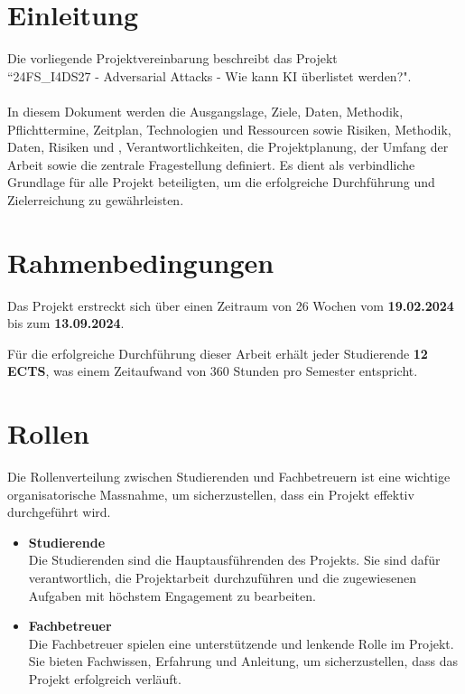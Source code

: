 \section{Einleitung}
Die vorliegende Projektvereinbarung beschreibt das Projekt \\ 
``24FS\_I4DS27 - Adversarial Attacks - Wie kann KI überlistet werden?". \\\\
In diesem Dokument werden die Ausgangslage, Ziele, Daten, Methodik, Pflichttermine, Zeitplan, Technologien und Ressourcen sowie Risiken, Methodik, Daten, Risiken und , Verantwortlichkeiten, die Projektplanung, der Umfang der Arbeit sowie die zentrale Fragestellung definiert. Es dient als verbindliche Grundlage für alle Projekt beteiligten, um die erfolgreiche Durchführung und Zielerreichung zu gewährleisten.

\section{Rahmenbedingungen}
Das Projekt erstreckt sich über einen Zeitraum von 26 Wochen vom \textbf{19.02.2024} bis zum \textbf{13.09.2024}. 

Für die erfolgreiche Durchführung dieser Arbeit erhält jeder Studierende \textbf{12 ECTS}, was einem Zeitaufwand von 360 Stunden pro Semester entspricht. 

\section{Rollen}
Die Rollenverteilung zwischen Studierenden und Fachbetreuern ist eine wichtige organisatorische Massnahme, um sicherzustellen, dass ein Projekt effektiv durchgeführt wird.

\begin{itemize}
    \item \textbf{Studierende} \\
    Die Studierenden sind die Hauptausführenden des Projekts. Sie sind dafür verantwortlich, die Projektarbeit durchzuführen und die zugewiesenen Aufgaben mit höchstem Engagement zu bearbeiten. 
    
    \item \textbf{Fachbetreuer} \\
    Die Fachbetreuer spielen eine unterstützende und lenkende Rolle im Projekt. Sie bieten Fachwissen, Erfahrung und Anleitung, um sicherzustellen, dass das Projekt erfolgreich verläuft. 
\end{itemize}